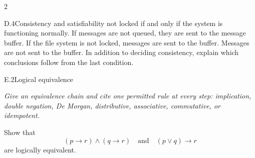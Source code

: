 \documentclass[9pt]{extarticle}
\begin{document}
\begin{multicols}{2}
\begin{CoreProblem}{D.4}{Consistency and satisfiability}
not locked if and only if the system is functioning normally. If messages are
not queued, they are sent to the message buffer. If the file system is not
locked, messages are sent to the buffer. Messages are not sent to the buffer.
In addition to deciding consistency, explain which conclusions follow from the
last condition.
\end{CoreProblem}
\begin{CoreProblem}{E.2}{Logical equivalence}
{\scriptsize\textit{Give an equivalence chain and cite one permitted rule at every step: implication, double negation, De Morgan, distributive, associative, commutative, or idempotent.}\par}
Show that
\[
  (p\to r)\land(q\to r)
  \quad\text{and}\quad
  (p\lor q)\to r
\]
are logically equivalent.
\end{CoreProblem}
\end{multicols}
\CoreWorkArea
\FormBreak
{}
\end{document}
